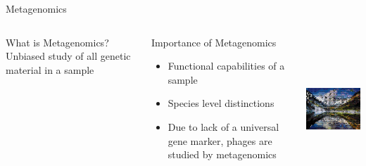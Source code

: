 \documentclass[11pt, xcolor=table]{beamer}
\begin{document}
  \begin{frame}{Metagenomics}
	\begin{columns}
	\begin{block}{What is Metagenomics?}
	Unbiased study of all genetic material in a sample
	\end{block}
	\begin{block}{Importance of Metagenomics}
	\begin{itemize}
	\item Functional capabilities of a sample
	\item Species level distinctions
	\item Due to lack of a universal gene marker, phages are studied by metagenomics
	\end{itemize}
	\end{block}
	
	\includegraphics[height=5.5cm, width=5cm]{mosaic.png}
	\end{columns}
	\end{frame}
\end{document}
